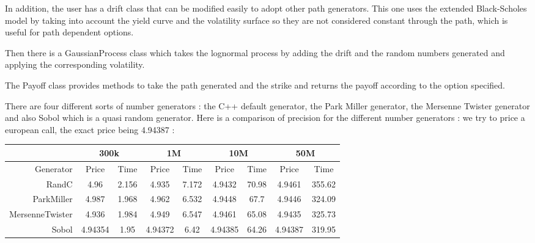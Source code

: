 \par In addition, the user has a drift class that can be modified
easily to adopt other path generators. This one uses the extended
Black-Scholes model by taking into account the yield curve and the
volatility surface so they are not considered constant through the
path, which is useful for path dependent options.

\par Then there is a GaussianProcess class which takes the lognormal
process by adding the drift and the random numbers generated and
applying the corresponding volatility.

\par The Payoff class provides methods to take the path generated and
the strike and returns the payoff according to the option
specified.

\par There are four different sorts of number generators : the C++
default generator, the Park Miller generator, the Mersenne Twister
generator and also Sobol which is a quasi random generator. Here is
a comparison of precision for the different number generators : we
try to price a european call, the exact price being 4.94387 :
\bigskip

\begin{tabular}{|r|cc|cc|cc|cc|}
\hline
           & \multicolumn{ 2}{|c|}{300k} & \multicolumn{ 2}{|c|}{1M} & \multicolumn{ 2}{|c|}{10M} & \multicolumn{ 2}{|c|}{50M} \\
\hline
 Generator &      Price &       Time &      Price &       Time &      Price &       Time &      Price &       Time \\

     RandC &       4.96 &      2.156 &      4.935 &      7.172 &     4.9432 &      70.98 &     4.9461 &     355.62 \\

ParkMiller &      4.987 &      1.968 &      4.962 &      6.532 &     4.9448 &       67.7 &     4.9446 &     324.09 \\

MersenneTwister &      4.936 &      1.984 &      4.949 &      6.547 &     4.9461 &      65.08 &     4.9435 &     325.73 \\

     Sobol &    4.94354 &       1.95 &    4.94372 &       6.42 &    4.94385 &      64.26 &    4.94387 &     319.95 \\
\hline
\end{tabular}

